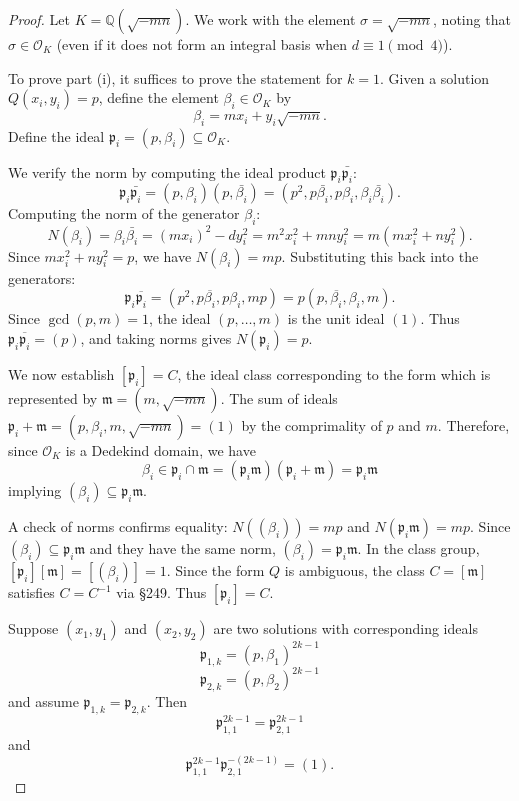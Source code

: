 \documentclass[11pt]{amsart}
\theoremstyle{definition}
\begin{document}
\begin{proof}
Let $K = \mathbb{Q}(\sqrt{-mn})$. We work with the element $\sigma = \sqrt{-mn}$, noting that $\sigma \in \mathcal{O}_K$ (even if it does not form an integral basis when $d \equiv 1 \pmod 4$).

To prove part (i), it suffices to prove the statement for $k=1$. Given a solution $Q(x_i,y_i) = p$, define the element $\beta_i \in \mathcal{O}_K$ by
\[
\beta_i = mx_i + y_i\sqrt{-mn}.
\]
Define the ideal $\mathfrak{p}_i = (p, \beta_i) \subseteq \mathcal{O}_K$.

We verify the norm by computing the ideal product $\mathfrak{p}_i \bar{\mathfrak{p}_i}$:
\[
\mathfrak{p}_i \bar{\mathfrak{p}_i} = (p, \beta_i)(p, \bar{\beta_i}) = (p^2, p\bar{\beta_i}, p\beta_i, \beta_i\bar{\beta_i}).
\]
Computing the norm of the generator $\beta_i$:
\[
N(\beta_i) = \beta_i\bar{\beta_i} = (mx_i)^2 - d y_i^2 = m^2x_i^2 + mn y_i^2 = m(mx_i^2 + ny_i^2).
\]
Since $mx_i^2 + ny_i^2 = p$, we have $N(\beta_i) = mp$. Substituting this back into the generators:
\[
\mathfrak{p}_i \overline{\mathfrak{p}_i} = (p^2, p\overline{\beta_i}, p\beta_i, mp) = p(p, \overline{\beta_i}, \beta_i, m).
\]
Since $\gcd(p,m)=1$, the ideal $(p, \dots, m)$ is the unit ideal $(1)$. Thus $\mathfrak{p}_i \overline{\mathfrak{p}_i} = (p)$, and taking norms gives $N(\mathfrak{p}_i) = p$.

We now establish $[\mathfrak{p}_i] = C$, the ideal class corresponding to the form which is represented by $\mathfrak{m} = (m, \sqrt{-mn})$.
The sum of ideals $\mathfrak{p}_i+\mathfrak{m}=(p,\beta_i,m,\sqrt{-mn})=(1)$ by the comprimality of $p$ and $m$. Therefore, since $\mathcal{O}_K$ is a Dedekind domain, we have
\[
\beta_i\in\mathfrak{p}_i\cap\mathfrak{m}=(\mathfrak{p}_i\mathfrak{m})(\mathfrak{p}_i+\mathfrak{m})=\mathfrak{p}_i\mathfrak{m}
\]
implying $(\beta_i)\subseteq \mathfrak{p}_i\mathfrak{m}$.

A check of norms confirms equality: $N((\beta_i)) = m p$ and $N(\mathfrak{p}_i \mathfrak{m}) = mp$. Since $(\beta_i) \subseteq \mathfrak{p}_i \mathfrak{m}$ and they have the same norm, $(\beta_i) = \mathfrak{p}_i \mathfrak{m}$.
In the class group, $[\mathfrak{p}_i][\mathfrak{m}] = [(\beta_i)] = 1$.
Since the form $Q$ is ambiguous, the class $C = [\mathfrak{m}]$ satisfies $C = C^{-1}$ via \cite{Gauss} \S 249. Thus $[\mathfrak{p}_i] = C$.

Suppose $(x_1,y_1)$ and $(x_2,y_2)$ are two solutions with corresponding ideals
\[
\mathfrak{p}_{1,k}=(p,\beta_1)^{2k-1}\]
\[\mathfrak{p}_{2,k}=(p,\beta_2)^{2k-1}
\]
and assume $\mathfrak{p}_{1,k}=\mathfrak{p}_{2,k}$. Then 
\[
\mathfrak{p}_{1,1}^{2k-1}=\mathfrak{p}_{2,1}^{2k-1}
\]
and 
\[
\mathfrak{p}_{1,1}^{2k-1}\mathfrak{p}_{2,1}^{-(2k-1)}=(1).
\]


\end{proof}
\end{document}
